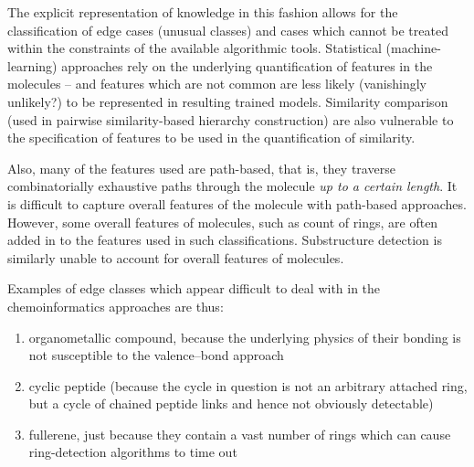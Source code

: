 \documentclass[10pt]{bmc_article}
\newenvironment{bmcformat}{\baselineskip20pt\sloppy\setboolean{publ}{false}}{\baselineskip20pt\sloppy}
\begin{document}
\begin{bmcformat}
The explicit representation of knowledge in this fashion allows for the classification of edge cases (unusual classes)
 and cases which cannot be treated within the constraints of the available algorithmic tools. %
 Statistical (machine-learning) approaches rely on the underlying quantification of features in the molecules -- and features which are not common are less likely (vanishingly unlikely?) to be represented in resulting trained models. Similarity comparison (used in pairwise similarity-based hierarchy construction) are also vulnerable to the specification of features to be used in the quantification of similarity. 
 
Also, many of the features used are path-based, that is, they traverse combinatorially exhaustive paths through the molecule \textit{up to a certain length}.  It is difficult to capture overall features of the molecule with path-based approaches.  However, some overall features of molecules, such as count of rings, are often added in to the features used in such classifications. Substructure detection is similarly unable to account for overall features of molecules.  %

Examples of edge classes which appear difficult to deal with in the chemoinformatics approaches are thus:
\begin{enumerate}
  \item organometallic compound, because the underlying physics of their bonding is not susceptible to the valence--bond approach
	\item cyclic peptide (because the cycle in question is not an arbitrary attached ring, but a cycle of chained peptide links and hence not obviously detectable)
	\item fullerene, just because they contain a vast number of rings which can cause ring-detection algorithms to time out
\end{enumerate}



\end{bmcformat}
\end{document}

